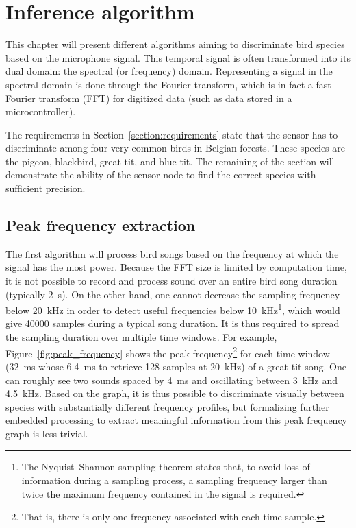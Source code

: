 \documentclass{EPL-master-thesis-covers-EN}
\begin{document}
    
\chapter{Inference algorithm}

This chapter will present different algorithms aiming to discriminate bird species based on the microphone signal. This temporal signal is often transformed into its dual domain: the spectral (or frequency) domain. Representing a signal in the spectral domain is done through the Fourier transform, which is in fact a fast Fourier transform (FFT) for digitized data (such as data stored in a microcontroller).

The requirements in Section~\ref{section:requirements} state that the sensor has to discriminate among four very common birds in Belgian forests. These species are the pigeon, blackbird, great tit, and blue tit. The remaining of the section will demonstrate the ability of the sensor node to find the correct species with sufficient precision.

\section{Peak frequency extraction}

The first algorithm will process bird songs based on the frequency at which the signal has the most power. Because the FFT size is limited by computation time, it is not possible to record and process sound over an entire bird song duration (typically \SI{2}{s}). On the other hand, one cannot decrease the sampling frequency below \SI{20}{kHz} in order to detect useful frequencies below \SI{10}{kHz}\footnote{The Nyquist–Shannon sampling theorem states that, to avoid loss of information during a sampling process, a sampling frequency larger than twice the maximum frequency contained in the signal is required.}, which would give \SI{40000}{} samples during a typical song duration. It is thus required to spread the sampling duration over multiple time windows. For example, Figure~\ref{fig:peak_frequency} shows the peak frequency\footnote{That is, there is only one frequency associated with each time sample.} for each time window (\SI{32}{ms} whose \SI{6.4}{ms} to retrieve 128 samples at \SI{20}{kHz}) of a great tit song. One can roughly see two sounds spaced by \SI{4}{ms} and oscillating between \SI{3}{kHz} and \SI{4.5}{kHz}. Based on the graph, it is thus possible to discriminate visually between species with substantially different frequency profiles, but formalizing further embedded processing to extract meaningful information from this peak frequency graph is less trivial.
\end{document}
